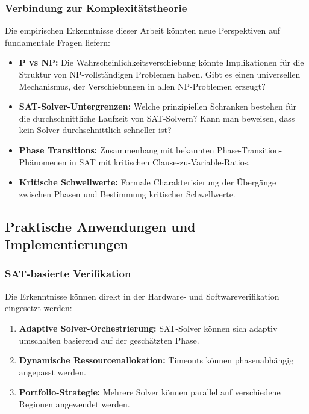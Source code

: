 ﻿\documentclass[a4paper,12pt]{article}
\theoremstyle{definition}
\begin{document}
\subsubsection{Verbindung zur Komplexitätstheorie}

Die empirischen Erkenntnisse dieser Arbeit könnten neue Perspektiven auf fundamentale Fragen liefern:

\begin{itemize}
	\item \textbf{P vs NP:} Die Wahrscheinlichkeitsverschiebung könnte Implikationen für die Struktur von NP-vollständigen Problemen haben. Gibt es einen universellen Mechanismus, der Verschiebungen in allen NP-Problemen erzeugt?
	
	\item \textbf{SAT-Solver-Untergrenzen:} Welche prinzipiellen Schranken bestehen für die durchschnittliche Laufzeit von SAT-Solvern? Kann man beweisen, dass kein Solver durchschnittlich schneller ist?
	
	\item \textbf{Phase Transitions:} Zusammenhang mit bekannten Phase-Transition-Phänomenen in SAT mit kritischen Clause-zu-Variable-Ratios.
	
	\item \textbf{Kritische Schwellwerte:} Formale Charakterisierung der Übergänge zwischen Phasen und Bestimmung kritischer Schwellwerte.
\end{itemize}

\subsection{Praktische Anwendungen und Implementierungen}

\subsubsection{SAT-basierte Verifikation}

Die Erkenntnisse können direkt in der Hardware- und Softwareverifikation eingesetzt werden:

\begin{enumerate}
	\item \textbf{Adaptive Solver-Orchestrierung:} SAT-Solver können sich adaptiv umschalten basierend auf der geschätzten Phase.
	
	\item \textbf{Dynamische Ressourcenallokation:} Timeouts können phasenabhängig angepasst werden.
	
	\item \textbf{Portfolio-Strategie:} Mehrere Solver können parallel auf verschiedene Regionen angewendet werden.
\end{enumerate}
\end{document}
